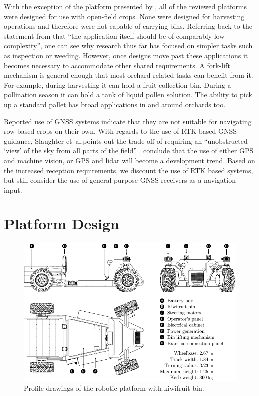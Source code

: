 \documentclass[preprint,authoryear,12pt]{elsarticle}
\begin{document}
        With the exception of the platform presented by \cite{Scarfe2012}, all of the reviewed platforms were designed for use with open-field crops.
        None were designed for harvesting operations and therefore were not capable of carrying bins.
        Referring back to the statement from \cite{Ruckelshausen2009} that ``the application itself should be of comparably low complexity'', one can see why research thus far has focused on simpler tasks such as inspection or weeding.
        However, once designs move past these applications it becomes necessary to accommodate other shared requirements.
        A fork-lift mechanism is general enough that most orchard related tasks can benefit from it.
        For example, during harvesting it can hold a fruit collection bin.
        During a pollination season it can hold a tank of liquid pollen solution.
        The ability to pick up a standard pallet has broad applications in and around orchards too.

        Reported use of GNSS systems indicate that they are not suitable for navigating row based crops on their own.
        With regards to the use of RTK based GNSS guidance, Slaughter et~al.\@ points out the trade-off of requiring an ``unobstructed `view' of the sky from all parts of the field'' \citep{Slaughter2008}.
        \cite{Li2009} conclude that the use of either GPS and machine vision, or GPS and lidar will become a development trend.
        Based on the increased reception requirements, we discount the use of RTK based systems, but still consider the use of general purpose GNSS receivers as a navigation input.

\section{Platform Design}
\label{sect:design}
        \begin{figure}[htb]
            \centering
            \includegraphics[width=\linewidth]{images/AMMP-All-Labelled.pdf}
            \caption{Profile drawings of the robotic platform with kiwifruit bin.}
            \label{fig:AMMP}
        \end{figure}
\end{document}
